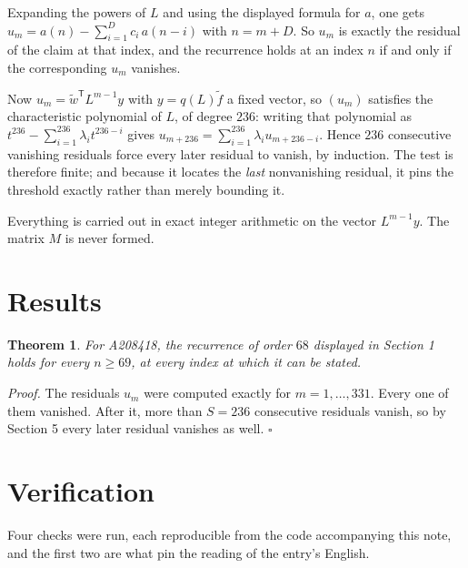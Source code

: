 \documentclass[11pt]{article}
\newtheorem{theorem}{Theorem}
\theoremstyle{definition}
\begin{document}
Expanding the powers of $L$ and using the displayed formula for $a$, one gets $u_m = a(n) - \sum_{i=1}^{D} c_i\,a(n-i)$ with $n = m + D$. So $u_m$ is exactly the residual of the claim at that index, and the recurrence holds at an index $n$ if and only if the corresponding $u_m$ vanishes.

Now $u_m = \tilde w^{\mathsf T} L^{m-1} y$ with $y = q(L)\tilde f$ a fixed vector, so $(u_m)$ satisfies the characteristic polynomial of $L$, of degree $236$: writing that polynomial as $t^{236} - \sum_{i=1}^{236} \lambda_i t^{236-i}$ gives $u_{m+236} = \sum_{i=1}^{236} \lambda_i u_{m+236-i}$. Hence $236$ consecutive vanishing residuals force every later residual to vanish, by induction. The test is therefore finite; and because it locates the {\itshape last} nonvanishing residual, it pins the threshold exactly rather than merely bounding it.

Everything is carried out in exact integer arithmetic on the vector $L^{m-1}y$. The matrix $M$ is never formed.

\section{Results}

\begin{theorem} For A208418, the recurrence of order $68$ displayed in Section 1 holds for every $n \ge 69$, at every index at which it can be stated.\end{theorem}

{\itshape Proof.} The residuals $u_m$ were computed exactly for $m = 1,\dots,331$. Every one of them vanished. After it, more than $S = 236$ consecutive residuals vanish, so by Section 5 every later residual vanishes as well. $\square$

\section{Verification}

Four checks were run, each reproducible from the code accompanying this note, and the first two are what pin the reading of the entry's English.
\end{document}
